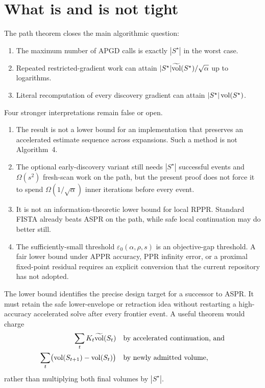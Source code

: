 \documentclass[11pt]{article}
\begin{document}
\section{What is and is not tight}
\label{sec:tightness-scope}

The path theorem closes the main algorithmic question:
\begin{enumerate}[leftmargin=*]
\item The maximum number of APGD calls is exactly $|S^\star|$ in the worst
      case.
\item Repeated restricted-gradient work can attain
      $|S^\star|\widetilde{\operatorname{vol}}(S^\star)/\sqrt\alpha$ up to logarithms.
\item Literal recomputation of every discovery gradient can attain
      $|S^\star|\operatorname{vol}(S^\star)$.
\end{enumerate}

Four stronger interpretations remain false or open.
\begin{enumerate}[leftmargin=*]
\item The result is not a lower bound for an implementation that preserves an
      accelerated estimate sequence across expansions.  Such a method is not
      Algorithm~4.
\item The optional early-discovery variant still needs $|S^\star|$ successful
      events and $\Omega(s^2)$ fresh-scan work on the path, but the present
      proof does not force it to spend $\Omega(1/\sqrt\alpha)$ inner
      iterations before every event.
\item It is not an information-theoretic lower bound for local RPPR.  Standard
      FISTA already beats ASPR on the path, while safe local continuation may
      do better still.
\item The sufficiently-small threshold
      $\varepsilon_0(\alpha,\rho,s)$ is an objective-gap threshold.  A fair
      lower bound under APPR accuracy, PPR infinity error, or a proximal
      fixed-point residual requires an explicit conversion that the current
      repository has not adopted.
\end{enumerate}

The lower bound identifies the precise design target for a successor to
ASPR.  It must retain the safe lower-envelope or retraction idea without
restarting a high-accuracy accelerated solve after every frontier event.  A
useful theorem would charge
\begin{equation}
 \begin{aligned}
  \sum_t K_t\widetilde{\operatorname{vol}}(S_t)
  &\quad\text{by accelerated continuation, and}\\
  \sum_t\bigl(\operatorname{vol}(S_{t+1})-\operatorname{vol}(S_t)\bigr)
  &\quad\text{by newly admitted volume},
 \end{aligned}
 \label{eq:desired-amortization}
\end{equation}
rather than multiplying both final volumes by $|S^\star|$.
\end{document}
